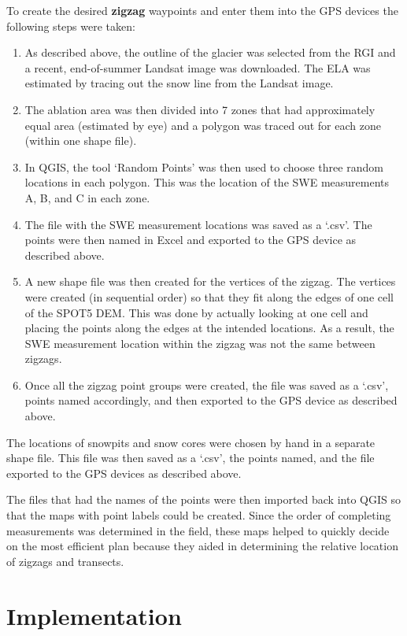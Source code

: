 \documentclass[12pt]{article}
\begin{document}
To create the desired \textbf{zigzag} waypoints and enter them into the GPS devices the following steps were taken:
\begin{enumerate}
\item As described above, the outline of the glacier was selected from the RGI and a recent, end-of-summer Landsat image was downloaded. The ELA was estimated by tracing out the snow line from the Landsat image.
\item The ablation area was then divided into 7 zones that had approximately equal area (estimated by eye) and a polygon was traced out for each zone (within one shape file). 
\item In QGIS, the tool `Random Points' was then used to choose three random locations in each polygon. This was the location of the SWE measurements A, B, and C in each zone. 
\item The file with the SWE measurement locations was saved as a `.csv'. The points were then named in Excel and exported to the GPS device as described above.
\item A new shape file was then created for the vertices of the zigzag. The vertices were created (in sequential order) so that they fit along the edges of one cell of the SPOT5 DEM. This was done by actually looking at one cell and placing the points along the edges at the intended locations. As a result, the SWE measurement location within the zigzag was not the same between zigzags. 
\item Once all the zigzag point groups were created, the file was saved as a `.csv', points named accordingly, and then exported to the GPS device as described above. 
\end{enumerate}

The locations of snowpits and snow cores were chosen by hand in a separate shape file. This file was then saved as a `.csv', the points named, and the file exported to the GPS devices as described above. 

The files that had the names of the points were then imported back into QGIS so that the maps with point labels could be created.  Since the order of completing measurements was determined in the field, these maps helped to quickly decide on the most efficient plan because they aided in determining the relative location of zigzags and transects.

\section{Implementation}
\end{document}
